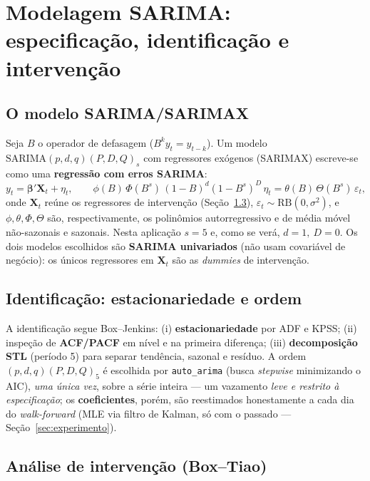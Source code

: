 \documentclass[11pt,a4paper]{article}
\begin{document}
\section{Modelagem SARIMA: especificação, identificação e intervenção}
\label{sec:sarima-modelo}

\subsection{O modelo SARIMA/SARIMAX}
\label{sec:sarima}

Seja $B$ o operador de defasagem ($B^k y_t = y_{t-k}$). Um modelo
$\text{SARIMA}(p,d,q)(P,D,Q)_s$ com regressores exógenos (SARIMAX) escreve-se como uma
\textbf{regressão com erros SARIMA}:
\begin{equation}
y_t = \boldsymbol{\beta}'\mathbf{X}_t + \eta_t,
\qquad
\phi(B)\,\Phi(B^s)\,(1-B)^d(1-B^s)^D\,\eta_t = \theta(B)\,\Theta(B^s)\,\varepsilon_t,
\label{eq:sarimax}
\end{equation}
onde $\mathbf{X}_t$ reúne os regressores de intervenção (Seção~\ref{sec:interv}),
$\varepsilon_t \sim \text{RB}(0,\sigma^2)$, e $\phi,\theta,\Phi,\Theta$ são, respectivamente, os
polinômios autorregressivo e de média móvel não-sazonais e sazonais. Nesta aplicação $s=5$ e, como
se verá, $d=1,\ D=0$. Os dois modelos escolhidos são \textbf{SARIMA univariados} (não usam
covariável de negócio): os únicos regressores em $\mathbf{X}_t$ são as \emph{dummies} de
intervenção.

\subsection{Identificação: estacionariedade e ordem}
\label{sec:ident}

A identificação segue Box--Jenkins: (i) \textbf{estacionariedade} por ADF e KPSS; (ii) inspeção de
\textbf{ACF/PACF} em nível e na primeira diferença; (iii) \textbf{decomposição STL} (período 5)
para separar tendência, sazonal e resíduo. A ordem $(p,d,q)(P,D,Q)_5$ é escolhida por
\texttt{auto\_arima} (busca \emph{stepwise} minimizando o AIC), \emph{uma única vez}, sobre a série
inteira --- um vazamento \emph{leve e restrito à especificação}; os \textbf{coeficientes}, porém,
são reestimados honestamente a cada dia do \emph{walk-forward} (MLE via filtro de Kalman, só com o
passado --- Seção~\ref{sec:experimento}).

\subsection{Análise de intervenção (Box--Tiao)}
\label{sec:interv}
\end{document}
